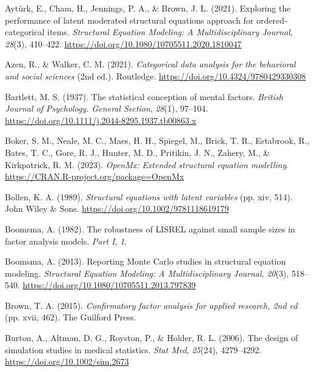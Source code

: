 \documentclass[
  11pt,
  man]{apa6}
\newlength{\cslhangindent}
\newlength{\cslentryspacingunit} %
\newenvironment{CSLReferences}[2] %
 {%
  \setlength{\parindent}{0pt}
  \ifodd #1
  \let\oldpar\par
  \def\par{\hangindent=\cslhangindent\oldpar}
  \fi
  \setlength{\parskip}{#2\cslentryspacingunit}
 }%
 {}
\begin{document}
\begin{CSLReferences}{1}{0}
\leavevmode{}%
Aytürk, E., Cham, H., Jennings, P. A., \& Brown, J. L. (2021). Exploring the {performance} of {latent moderated structural equations approach} for {ordered-categorical items}. \emph{Structural Equation Modeling: A Multidisciplinary Journal}, \emph{28}(3), 410--422. \url{https://doi.org/10.1080/10705511.2020.1810047}

\leavevmode{}%
Azen, R., \& Walker, C. M. (2021). \emph{Categorical {data analysis} for the {behavioral} and {social sciences}} (2nd ed.). Routledge. \url{https://doi.org/10.4324/9780429330308}

\leavevmode{}%
Bartlett, M. S. (1937). The statistical conception of mental factors. \emph{British Journal of Psychology. General Section}, \emph{28}(1), 97--104. \url{https://doi.org/10.1111/j.2044-8295.1937.tb00863.x}

\leavevmode{}%
Boker, S. M., Neale, M. C., Maes, H. H., Spiegel, M., Brick, T. R., Estabrook, R., Bates, T. C., Gore, R. J., Hunter, M. D., Pritikin, J. N., Zahery, M., \& Kirkpatrick, R. M. (2023). \emph{OpenMx: Extended structural equation modelling}. \url{https://CRAN.R-project.org/package=OpenMx}

\leavevmode{}%
Bollen, K. A. (1989). \emph{Structural equations with latent variables} (pp. xiv, 514). John Wiley \& Sons. \url{https://doi.org/10.1002/9781118619179}

\leavevmode{}%
Boomsma, A. (1982). The robustness of {LISREL} against small sample sizes in factor analysis models. \emph{Part I}, \emph{1}.

\leavevmode{}%
Boomsma, A. (2013). Reporting {Monte Carlo studies} in {structural equation modeling}. \emph{Structural Equation Modeling: A Multidisciplinary Journal}, \emph{20}(3), 518--540. \url{https://doi.org/10.1080/10705511.2013.797839}

\leavevmode{}%
Brown, T. A. (2015). \emph{Confirmatory factor analysis for applied research, 2nd ed} (pp. xvii, 462). The Guilford Press.

\leavevmode{}%
Burton, A., Altman, D. G., Royston, P., \& Holder, R. L. (2006). The design of simulation studies in medical statistics. \emph{Stat Med}, \emph{25}(24), 4279--4292. \url{https://doi.org/10.1002/sim.2673}


\end{CSLReferences}
\end{document}
